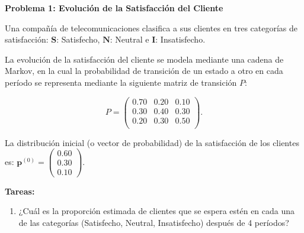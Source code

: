 \documentclass{article}
\begin{document}
\begin{problem}
\textbf{Problema 1: Evolución de la Satisfacción del Cliente}

Una compañía de telecomunicaciones clasifica a sus clientes en tres categorías de satisfacción:
\(\mathbf{S}\): Satisfecho, \(\mathbf{N}\): Neutral e \(\mathbf{I}\): Insatisfecho.

La evolución de la satisfacción del cliente se modela mediante una cadena de Markov, en la cual la probabilidad de transición de un estado a otro en cada período se representa mediante la siguiente matriz de transición \(P\):

\[
P = \begin{pmatrix}
0.70 & 0.20 & 0.10 \\
0.30 & 0.40 & 0.30 \\
0.20 & 0.30 & 0.50 \\
\end{pmatrix}.
\]

La distribución inicial (o vector de probabilidad) de la satisfacción de los clientes es: \(\mathbf{p}^{(0)} = \begin{pmatrix} 0.60 \\ 0.30 \\ 0.10 \end{pmatrix}.\)

\textbf{Tareas:}
\begin{enumerate}
    \item ¿Cuál es la proporción estimada de clientes que se espera estén en cada una de las categorías (Satisfecho, Neutral, Insatisfecho) después de 4 períodos?
\end{enumerate}
\end{problem}
\end{document}
